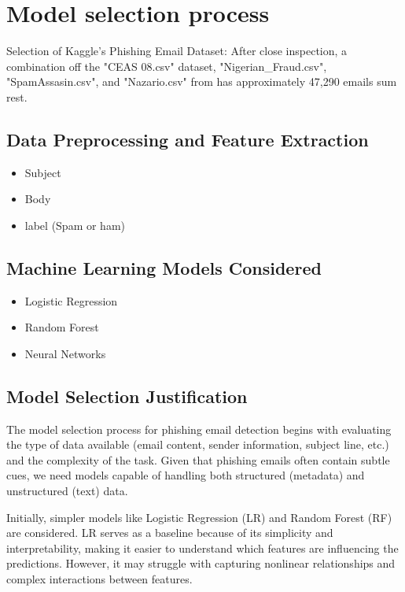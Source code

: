 \documentclass{article}
\begin{document}
\newpage

\section{Model selection process}
Selection of Kaggle's Phishing Email Dataset:
After close inspection, a combination off the "CEAS 08.csv" dataset, "Nigerian_Fraud.csv", "SpamAssasin.csv", and "Nazario.csv" from has approximately 47,290 emails sum rest. 

\subsection{Data Preprocessing and Feature Extraction }

\begin{itemize}
    \item Subject 
    \item Body
    \item label (Spam or ham)
\end{itemize}


\subsection{Machine Learning Models Considered}
\begin{itemize}
    \item Logistic Regression
    \item Random Forest
    \item Neural Networks
\end{itemize}

\subsection{Model Selection Justification}
The model selection process for phishing email detection begins with evaluating the type of data available (email content, sender information, subject line, etc.) and the complexity of the task. Given that phishing emails often contain subtle cues, we need models capable of handling both structured (metadata) and unstructured (text) data.

Initially, simpler models like Logistic Regression (LR) and Random Forest (RF) are considered. LR serves as a baseline because of its simplicity and interpretability, making it easier to understand which features are influencing the predictions. However, it may struggle with capturing nonlinear relationships and complex interactions between features.
\end{document}
